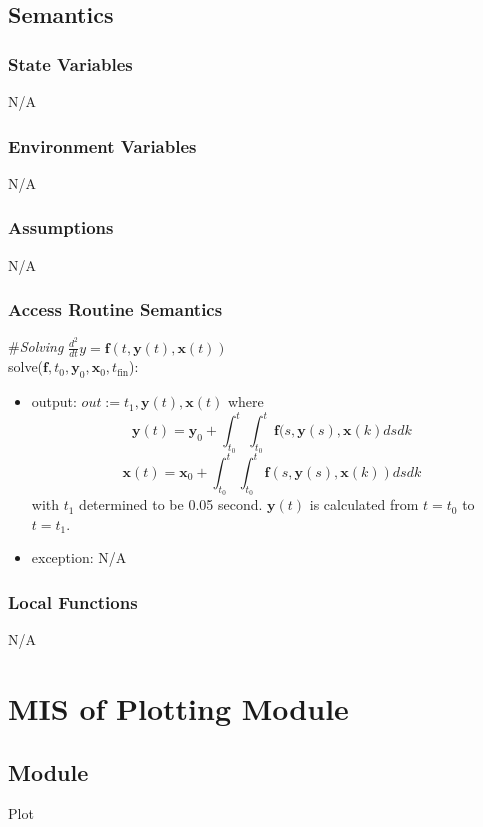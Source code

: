\documentclass[12pt, titlepage]{article}
\begin{document}
\subsection{Semantics}

\subsubsection{State Variables}
N/A

\subsubsection{Environment Variables}

N/A
\subsubsection{Assumptions}

N/A
\subsubsection{Access Routine Semantics}

\#\textit{Solving} $ \frac{d^2}{dt} {y}  = \mathbf{f}(t,
\mathbf{y}(t), \mathbf{x}(t))$\\

\noindent solve($\textbf{f}, t_0, \textbf{y}_0, \textbf{x}_0, t_\text{fin}$): 
\begin{itemize}
\item output: $out := t_1, \textbf{y}(t), \textbf{x}(t)$ where 
$$\textbf{y}(t) = \textbf{y}_0 + \int_{t_0}^{t}\int_{t_0}^{t} \textbf{f}(s, \textbf{y}(s),\textbf{x}(k) dsdk$$ 
$$\textbf{x}(t) = \textbf{x}_0 + \int_{t_0}^{t}\int_{t_0}^{t} \textbf{f}(s, \textbf{y}(s),\textbf{x}(k)) dsdk$$ 
with $t_1$ determined to be 0.05 second.  $\textbf{y}(t)$ is
calculated from $t = t_0$ to $t = t_1$.
\item exception: N/A
\end{itemize}
\subsubsection{Local Functions}

N/A

\newpage
\section{MIS of Plotting Module} \label{PModule} 

\subsection{Module}
Plot
\end{document}
